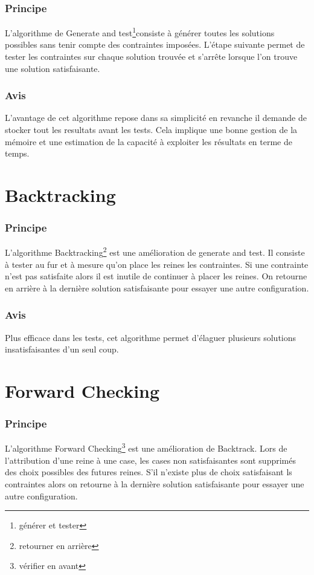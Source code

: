 \documentclass[a4paper,12pt]{report}
\begin{document}
	\subsubsection{Principe}
	L'algorithme de Generate and test\footnote{générer et tester}consiste à générer toutes les solutions possibles sans tenir compte des contraintes imposées. L'étape suivante permet de tester les contraintes sur chaque solution trouvée et s'arrête lorsque l'on trouve une solution satisfaisante. 
	\subsubsection{Avis}
	L'avantage de cet algorithme repose dans sa simplicité en revanche il demande de stocker tout les resultats avant les tests. Cela implique une bonne gestion de la mémoire et une estimation de la capacité à exploiter les résultats en terme de temps.

	\section{Backtracking}
	\subsubsection{Principe}
	L'algorithme Backtracking\footnote{retourner en arrière} est une amélioration de generate and test. Il consiste à tester au fur et à mesure qu'on place les reines les contraintes. Si une contrainte n'est pas satisfaite alors il est inutile de continuer à placer les reines. On retourne en arrière à la dernière solution satisfaisante pour essayer une autre configuration.
	\subsubsection{Avis}
	Plus efficace dans les tests, cet algorithme permet d'élaguer plusieurs solutions insatisfaisantes d'un seul coup.
	\section{Forward Checking}
	\subsubsection{Principe}
	L'algorithme Forward Checking\footnote{vérifier en avant} est une amélioration de Backtrack. Lors de l'attribution d'une reine à une case, les cases non satisfaisantes sont supprimés des choix possibles des futures reines. S'il n'existe plus de choix satisfaisant ls contraintes alors on retourne à la dernière solution satisfaisante pour essayer une autre configuration.
\end{document}
